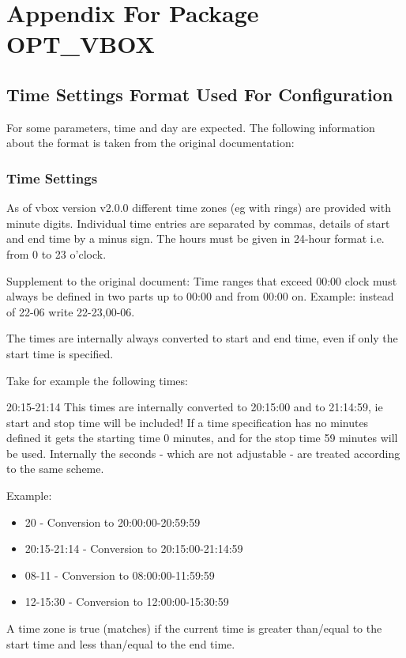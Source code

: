\section {Appendix For Package OPT\_VBOX}

\subsection{Time Settings Format Used For Configuration}

For some parameters, time and day are expected. The following
information about the format is taken from the original documentation:

\subsubsection{Time Settings}
As of vbox version v2.0.0 different time zones (eg with rings) are provided
with minute digits. Individual time entries are separated by commas, details
of start and end time by a minus sign. The hours must be given in 24-hour format
i.e. from 0 to 23 o'clock.

Supplement to the original document:
Time ranges that exceed 00:00 clock must always be defined in two parts up to
00:00 and from 00:00 on.
Example: instead of 22-06 write 22-23,00-06.

The times are internally always converted to start and end time, even
if only the start time is specified.

Take for example the following times:

20:15-21:14
This times are internally converted to 20:15:00 and to 21:14:59, ie start and
stop time will be included!
If a time specification has no minutes defined it gets the starting time
0 minutes, and for the stop time 59 minutes will be used. Internally the seconds
- which are not adjustable - are treated according to the same scheme.

Example:
\begin{itemize}
    \item 20 - Conversion to 20:00:00-20:59:59
    \item 20:15-21:14 - Conversion to 20:15:00-21:14:59
    \item 08-11 - Conversion to 08:00:00-11:59:59
    \item 12-15:30 - Conversion to 12:00:00-15:30:59
\end{itemize}

A time zone is true (matches) if the current time is greater than/equal to
the start time and less than/equal to the end time.

